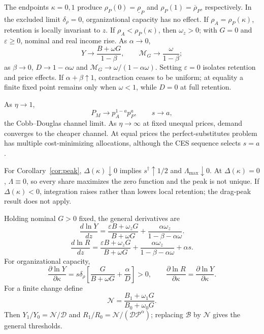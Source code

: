 The endpoints \(\kappa=0,1\) produce
\(\rho_P(0)=\underline\rho_P\) and
\(\rho_P(1)=\overline\rho_P\), respectively. In the excluded
limit \(\delta_\rho=0\), organizational capacity has no effect. If
\(\rho_A=\rho_P(\kappa)\), retention is locally invariant to \(z\). If
\(\rho_A<\rho_P(\kappa)\), then \(\omega_z>0\); with \(G=0\) and
\(\varepsilon\geq0\), nominal and real income rise. As \(\alpha\to0\),
\[
 Y\to\frac{B+\omega G}{1-\beta},\qquad
 \mathcal M_G\to\frac{\omega}{1-\beta};
\]
as \(\beta\to0\), \(D\to1-\alpha\omega\) and
\(\mathcal M_G\to\omega/(1-\alpha\omega)\). Setting \(\varepsilon=0\) isolates
retention and price effects. If \(\alpha+\beta\uparrow1\), contraction ceases
to be uniform; at equality a finite fixed point remains only when
\(\omega<1\), while \(D=0\) at full retention.

As \(\eta\to1\),
\begin{equation}
 P_M\to p_A^{1-a}p_P^a,\qquad s\to a,
 \label{eq:cobb-douglas-limit}
\end{equation}
the Cobb--Douglas channel limit. As \(\eta\to\infty\) at fixed unequal prices,
demand converges to the cheaper channel. At equal prices the
perfect-substitutes problem has multiple
cost-minimizing allocations, although the CES sequence selects \(s=a\).

For Corollary~\ref{cor:peak}, \(\Delta(\kappa)\downarrow0\) implies
\(s^\dagger\uparrow1/2\) and \(\Lambda_{\max}\downarrow0\). At
\(\Delta(\kappa)=0\), \(\Lambda\equiv0\), so every share maximizes the zero
function and the peak is not unique. If \(\Delta(\kappa)<0\), integration
raises rather than lowers local retention; the drag-peak result does not apply.

Holding nominal \(G>0\) fixed, the general derivatives are
\begin{equation}
 \frac{d\ln Y}{dz}
 =\frac{\varepsilon B+\omega_zG}{B+\omega G}
 +\frac{\alpha\omega_z}{1-\beta-\alpha\omega}.
\label{eq:general-g-derivative}
\end{equation}
\begin{equation}
 \frac{d\ln R}{dz}
 =\frac{\varepsilon B+\omega_zG}{B+\omega G}
 +\frac{\alpha\omega_z}{1-\beta-\alpha\omega}+\alpha s.
 \label{eq:general-g-real-derivative}
\end{equation}
For organizational capacity,
\begin{equation}
 \frac{\partial\ln Y}{\partial\kappa}
 =s\delta_\rho\left[
 \frac{G}{B+\omega G}+\frac{\alpha}{D}\right]>0,\qquad
 \frac{\partial\ln R}{\partial\kappa}
 =\frac{\partial\ln Y}{\partial\kappa}.
 \label{eq:general-capacity-derivative}
\end{equation}
For a finite change define
\begin{equation}
 \mathcal N=
 \frac{B_1+\omega_1G}{B_0+\omega_0G}.
 \label{eq:general-finite-numerator}
\end{equation}
Then \(Y_1/Y_0=\mathcal N/\mathcal D\) and
\(R_1/R_0=\mathcal N/(\mathcal D\mathcal P^\alpha)\); replacing
\(\mathcal B\) by \(\mathcal N\) gives the general thresholds.
